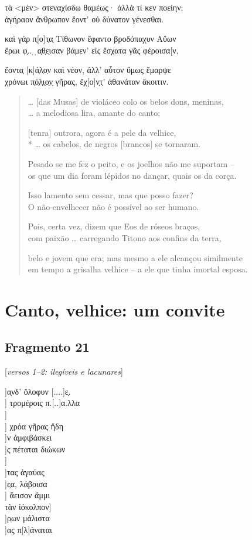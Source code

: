 {\begin{gkverse}
τὰ <μὲν> στεναχίσδω θαμέως· ἀλλὰ τί κεν ποείην;\\
ἀγήραον ἄνθρωπον ἔοντ’ οὐ δύνατον γένεσθαι.

καὶ γάρ π̣[ο]τ̣α̣ Τίθωνον ἔφαντο βροδόπαχυν Αὔων\\
ἔρωι φ̣.. ̣ ̣α̣θ̣ε̣ισαν βάμεν’ εἰς ἔσχατα γᾶς φέροισα[ν,

ἔοντα̣ [κ]ά̣λ̣ο̣ν καὶ νέον, ἀλλ’ αὖτον ὔμως ἔμαρψε\\
χρόνωι π̣ό̣λ̣ι̣ο̣ν̣ γῆρας, ἔχ[ο]ν̣τ̣’ ἀθανάταν ἄκοιτιν.
\end{gkverse}

\begin{verse}
\ldots{} [das Musas] de violáceo colo os belos dons, meninas,\\
\ldots{} a melodiosa lira, amante do canto;

[tenra] outrora, agora é a pele da velhice,\\*
\ldots{} os cabelos, de negros [brancos] se tornaram.


Pesado se me fez o peito, e os joelhos não me suportam -- \\
os que um dia foram lépidos no dançar, quais os da corça.

Isso lamento sem cessar, mas que posso fazer?\\
O não-envelhecer não é possível ao ser humano.

Pois, certa vez, dizem que Eos de róseos braços,\\
com paixão \ldots{} carregando Titono aos confins da terra,

belo e jovem que era; mas mesmo a ele alcançou similmente\\
em tempo a grisalha velhice -- a ele que tinha imortal esposa.
\end{verse}

\chapter{Canto, velhice: um convite}


\section{Fragmento 21}

\begin{gkverse}
\textnormal{[\textit{versos 1--2: ilegíveis e lacunares}]}

]α̣νδ’ ὄλοφυν [....]ε̣.\\
] τρομέροις π.[..]α.λλα\\
]\\
  ] χρόα γῆρας ἤδη\\
   ]ν ἀμφιβάσκει\\
     ]ς πέταται διώκων\\
     ]\\
     ]τας ἀγαύας\\
   ]ε̣α, λάβοισα\\
   ] ἄεισον ἄμμι\\
τὰν ἰόκολπον\qquad         ]\\
        ]ρ̣ων μάλιστα\\
         ]ας π[λ]άναται
\end{gkverse}


}
